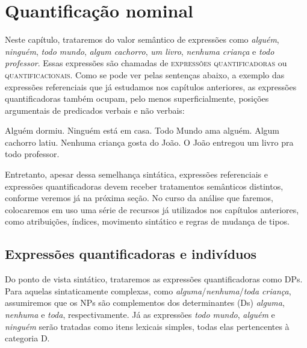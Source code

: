 
\chapter{Quantificação nominal}

Neste capítulo, trataremos do valor semântico de expressões como
\textit{alguém}, \textit{ninguém}, \textit{todo mundo}, \textit{algum cachorro}, \textit{um livro},
\textit{nenhuma criança} e \textit{todo professor}. Essas expressões são
chamadas de \textsc{expressões quantificadoras} ou
\textsc{quantificacionais}. Como se pode ver pelas sentenças
abaixo, a exemplo das expressões referenciais que já estudamos nos
capítulos anteriores, as expressões quantificadoras também ocupam,
pelo menos superficialmente, posições argumentais de predicados
verbais e não verbais:


\begin{exe}
    \ex\label{conw}
    \begin{xlist}
        \ex  Alguém dormiu.\label{conwa}
        \ex  Ninguém está em casa.\label{conwz}
        \ex  Todo Mundo ama alguém.\label{conwc}
        \ex  Algum cachorro latiu.\label{conwd}
        \ex  Nenhuma criança gosta do João.\label{conwe}
        \ex  O João entregou um livro pra todo professor.\label{conwf}
    \end{xlist}
\end{exe}

\n  Entretanto, apesar dessa semelhança sintática, expressões
referenciais e expressões quantificadoras devem receber
tratamentos semânticos distintos, conforme veremos já na próxima
seção. No curso da análise que faremos, colocaremos em uso uma
série de recursos já utilizados nos capítulos anteriores, como
atribuições, índices, movimento sintático e regras de mudança
de tipos.

\section{Expressões quantificadoras e indivíduos}

Do ponto de vista sintático, trataremos as expressões
quantificadoras como DPs. Para aquelas sintaticamente complexas,
como \textit{alguma}/\textit{nenhuma}/\textit{toda criança}, assumiremos que os NPs são
complementos dos determinantes (Ds) \textit{alguma}, \textit{nenhuma} e \textit{toda},
respectivamente. Já as expressões \textit{todo mundo}, \textit{alguém} e
\textit{ninguém} serão tratadas como itens lexicais simples, todas elas
pertencentes à categoria D.

